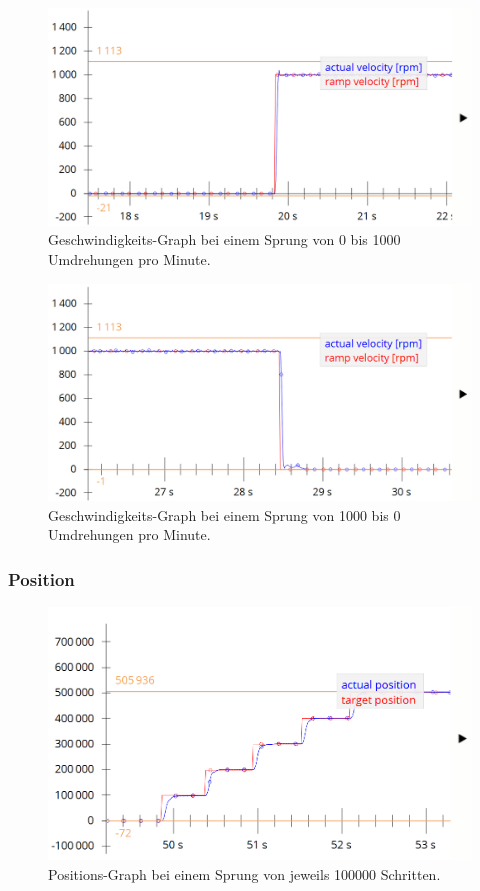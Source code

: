 \begin{figure}[H]
\center
\includegraphics[width = \textwidth]{graphics/PI_Velocity_Graph_0}
\caption{Geschwindigkeits-Graph bei einem Sprung von 0 bis 1000 Umdrehungen pro Minute.}
\label{fig:PI_Velocity_Graph_0}
\end{figure}

\begin{figure}[H]
\center
\includegraphics[width = \textwidth]{graphics/PI_Velocity_Graph_1}
\caption{Geschwindigkeits-Graph bei einem Sprung von 1000 bis 0 Umdrehungen pro Minute.}
\label{fig:PI_Velocity_Graph_1}
\end{figure}

\subsubsection{Position}\label{Appendix:PI_Position_0}

\begin{figure}[H]
\center
\includegraphics[width = \textwidth]{graphics/PI_Position_graph_0}
\caption{Positions-Graph bei einem Sprung von jeweils 100000 Schritten.}
\label{fig:PI_Position_graph_0}
\end{figure}